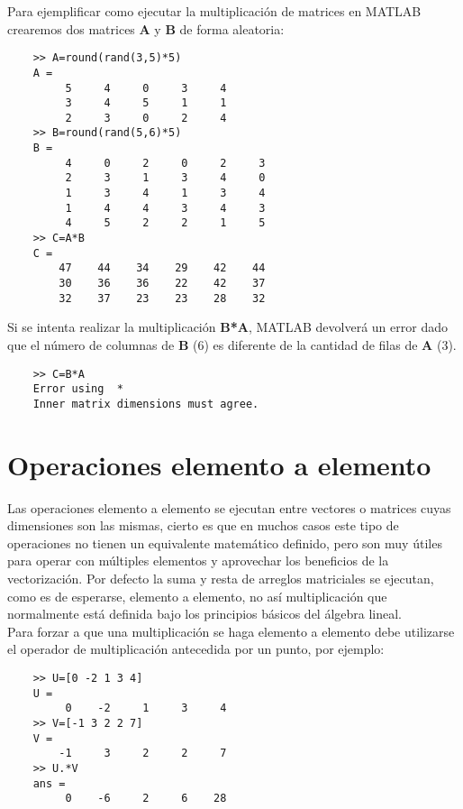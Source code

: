 Para ejemplificar como ejecutar la multiplicación de matrices en MATLAB crearemos dos matrices 
\textbf{A} y \textbf{B} de forma aleatoria:

\begin{verbatim}
	>> A=round(rand(3,5)*5)
	A =
	     5     4     0     3     4
	     3     4     5     1     1
	     2     3     0     2     4
	>> B=round(rand(5,6)*5)
	B =
	     4     0     2     0     2     3
	     2     3     1     3     4     0
	     1     3     4     1     3     4
	     1     4     4     3     4     3
	     4     5     2     2     1     5
	>> C=A*B
	C =
	    47    44    34    29    42    44
	    30    36    36    22    42    37
	    32    37    23    23    28    32
\end{verbatim}

Si se intenta realizar la multiplicación \textbf{B*A}, MATLAB devolverá un error dado que el número 
de columnas de \textbf{B} (6) es diferente de la cantidad de filas de \textbf{A} (3). 

\begin{verbatim}
	>> C=B*A
	Error using  * 
	Inner matrix dimensions must agree. 
\end{verbatim}

\section{Operaciones elemento a elemento}

Las operaciones elemento a elemento se ejecutan entre vectores o matrices cuyas dimensiones 
son las mismas, cierto es que en muchos casos este tipo de operaciones no tienen un 
equivalente matemático definido, pero son muy útiles para operar con múltiples elementos 
y aprovechar los beneficios de la vectorización. Por defecto la suma y resta de arreglos 
matriciales se ejecutan, como es de esperarse, elemento a elemento, no así multiplicación 
que normalmente está definida bajo los principios básicos del álgebra lineal.\\

Para forzar a que una multiplicación se haga elemento a elemento debe utilizarse el operador 
de multiplicación antecedida por un punto, por ejemplo:

\begin{verbatim}
	>> U=[0 -2 1 3 4]
	U =
	     0    -2     1     3     4
	>> V=[-1 3 2 2 7]
	V =
	    -1     3     2     2     7
	>> U.*V
	ans =
	     0    -6     2     6    28
\end{verbatim}

